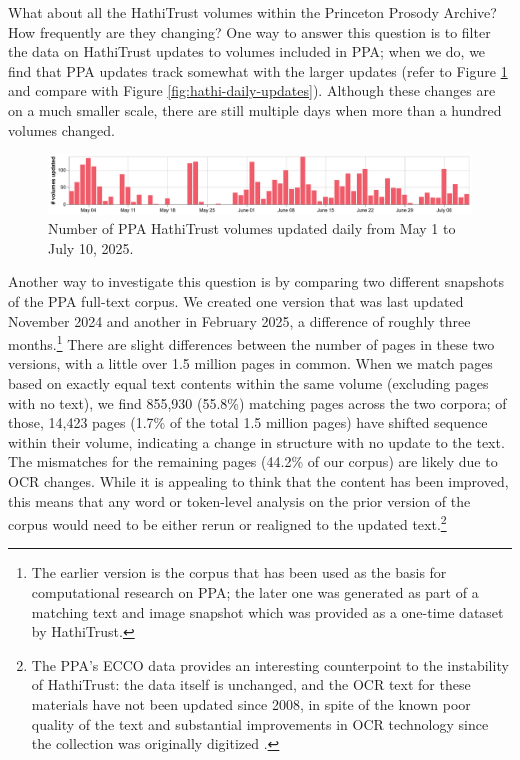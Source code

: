 \documentclass[final]{anthology-ch} %
\begin{document}
What about all the HathiTrust volumes within the Princeton Prosody Archive? How frequently are they changing? One way to answer this question is to filter the data on HathiTrust updates to volumes included in PPA; when we do, we find that PPA updates track somewhat with the larger updates (refer to Figure \ref{fig:ppa-daily-updates} and compare with Figure \ref{fig:hathi-daily-updates}). Although these changes are on a much smaller scale, there are still multiple days when more than a hundred volumes changed.

\begin{figure}[t!]
    \centering
    \includegraphics[width=1\linewidth]{figures/ppa_hathitrust_changes_countonly.pdf}
    \caption{Number of PPA HathiTrust volumes updated daily from May 1 to July 10, 2025.}
    \label{fig:ppa-daily-updates}
\end{figure}

Another way to investigate this question is by comparing two different snapshots of the PPA full-text corpus. We created one version that was last updated November 2024 and another in February 2025, a difference of roughly three months.\footnote{The earlier version is the corpus that has been used as the basis for computational research on PPA; the later one was generated as part of a matching text and image snapshot which was provided as a one-time dataset by HathiTrust.} There are slight differences between the number of pages in these two versions, with a little over 1.5 million pages in common. When we match pages based on exactly equal text contents within the same volume (excluding pages with no text), we find 855,930 (55.8\%) matching pages across the two corpora; of those, 14,423 pages (1.7\% of the total 1.5 million pages) have shifted sequence within their volume, indicating a change in structure with no update to the text. The mismatches for the remaining pages (44.2\% of our corpus) are likely due to OCR changes. While it is appealing to think that the content has been improved, this means that any word or token-level analysis on the prior version of the corpus would need to be either rerun or realigned to the updated text.\footnote{The PPA's ECCO data provides an interesting counterpoint to the instability of HathiTrust: the data itself is unchanged, and the OCR text for these materials have not been updated since 2008, in spite of the known poor quality of the text and substantial improvements in OCR technology since the collection was originally digitized \cite{hill_quantifying_2019}.}
\end{document}
